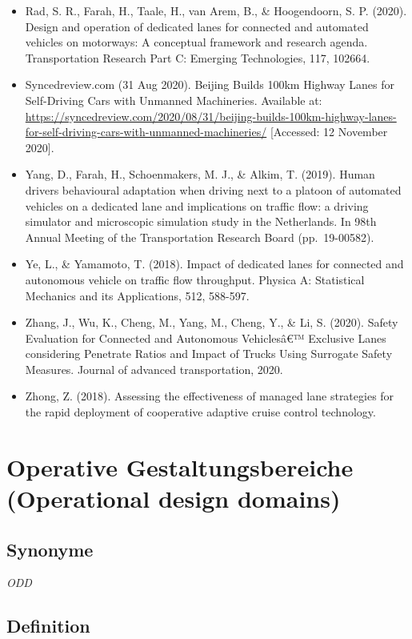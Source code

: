 \documentclass[
]{book}
\begin{document}
\begin{itemize}
\item
  Rad, S. R., Farah, H., Taale, H., van Arem, B., \& Hoogendoorn, S. P. (2020). Design and operation of dedicated lanes for connected and automated vehicles on motorways: A conceptual framework and research agenda. Transportation Research Part C: Emerging Technologies, 117, 102664.
\item
  Syncedreview.com (31 Aug 2020). Beijing Builds 100km Highway Lanes for Self-Driving Cars with Unmanned Machineries. Available at: \url{https://syncedreview.com/2020/08/31/beijing-builds-100km-highway-lanes-for-self-driving-cars-with-unmanned-machineries/} {[}Accessed: 12 November 2020{]}.
\item
  Yang, D., Farah, H., Schoenmakers, M. J., \& Alkim, T. (2019). Human drivers behavioural adaptation when driving next to a platoon of automated vehicles on a dedicated lane and implications on traffic flow: a driving simulator and microscopic simulation study in the Netherlands. In 98th Annual Meeting of the Transportation Research Board (pp.~19-00582).
\item
  Ye, L., \& Yamamoto, T. (2018). Impact of dedicated lanes for connected and autonomous vehicle on traffic flow throughput. Physica A: Statistical Mechanics and its Applications, 512, 588-597.
\item
  Zhang, J., Wu, K., Cheng, M., Yang, M., Cheng, Y., \& Li, S. (2020). Safety Evaluation for Connected and Autonomous Vehiclesâ€™ Exclusive Lanes considering Penetrate Ratios and Impact of Trucks Using Surrogate Safety Measures. Journal of advanced transportation, 2020.
\item
  Zhong, Z. (2018). Assessing the effectiveness of managed lane strategies for the rapid deployment of cooperative adaptive cruise control technology.
\end{itemize}

\hypertarget{ODD}{%
\section{Operative Gestaltungsbereiche (Operational design domains)}\label{ODD}}

\hypertarget{synonyme-1}{%
\subsection*{Synonyme}\label{synonyme-1}}

\emph{ODD}

\hypertarget{definition-1}{%
\subsection*{Definition}\label{definition-1}}
\end{document}
